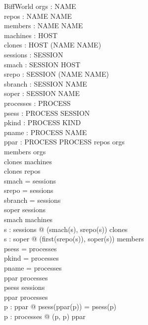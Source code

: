 \documentclass[a4paper,10pt,fleqn]{article}
\begin{document}
\begin{schema}{BiffWorld}
  orgs : \power NAME \\
  repos : NAME \rel NAME \\
  members : NAME \rel NAME \\
  machines : \power HOST \\
  clones : HOST \rel (NAME \cross NAME) \\
  sessions : \power SESSION \\
  smach : SESSION \pfun HOST \\
  srepo : SESSION \pfun (NAME \cross NAME) \\
  sbranch : SESSION \pfun NAME \\
  soper : SESSION \pfun NAME \\
  processes : \power PROCESS \\
  psess : PROCESS \pfun SESSION \\
  pkind : PROCESS \pfun KIND \\
  pname : PROCESS \pfun NAME \\
  ppar : PROCESS \pfun PROCESS
  \where
  \dom repos \subseteq orgs \\
  \dom members \subseteq orgs \\
  \dom clones \subseteq machines \\
  \ran clones \subseteq repos \\
  \dom smach = sessions \\
  \dom srepo = sessions \\
  \dom sbranch = sessions \\
  \dom soper \subseteq sessions \\
  \ran smach \subseteq machines \\
  \forall s : sessions @ (smach(s), srepo(s)) \in clones \\
  \forall s : \dom soper @
    (first(srepo(s)), soper(s)) \in members \\
  \dom psess = processes \\
  \dom pkind = processes \\
  \dom pname = processes \\
  \dom ppar \subseteq processes \\
  \ran psess \subseteq sessions \\
  \ran ppar \subseteq processes \\
  \forall p : \dom ppar @
    psess(ppar(p)) = psess(p) \\
  \forall p : processes @ (p, p) \notin ppar \plus
\end{schema}
\end{document}
